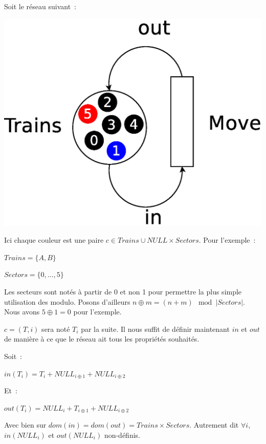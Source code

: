 Soit le réseau suivant~:

\begin{center}
\includegraphics[height = 0.4\paperwidth]{exo8_coloured_3.eps}
\end{center}

Ici chaque couleur est une paire $c \in Trains \cup NULL \times Sectors$. 
Pour l'exemple~:

$Trains = \{ A, B\}$

$Sectors = \{0, \ldots{}, 5\}$

Les secteurs sont notés à partir de 0 et non 1 pour permettre la plus simple 
utilisation des modulo. 
Posons d'ailleurs $n\oplus{m} = (n+m)\mod{\left|Sectors\right|}$. 
Nous avons $5\oplus{1} = 0$ pour l'exemple.

$c = (T, i)$ sera noté $T_i$ par la suite. Il nous suffit de définir maintenant 
$in$ et $out$ de manière à ce que le réseau ait tous les propriétés souhaités.

Soit~:

$in(T_i) = T_{i} + NULL_{i\oplus{1}} + NULL_{i\oplus{2}}$

Et~:

$out(T_i) = NULL_{i} + T_{i\oplus{1}} + NULL_{i\oplus{2}}$

Avec bien sur $dom(in) = dom(out) = Trains \times Sectors$. Autrement dit 
$\forall i$, $in(NULL_i)$ et $out(NULL_i)$ non-définis.
